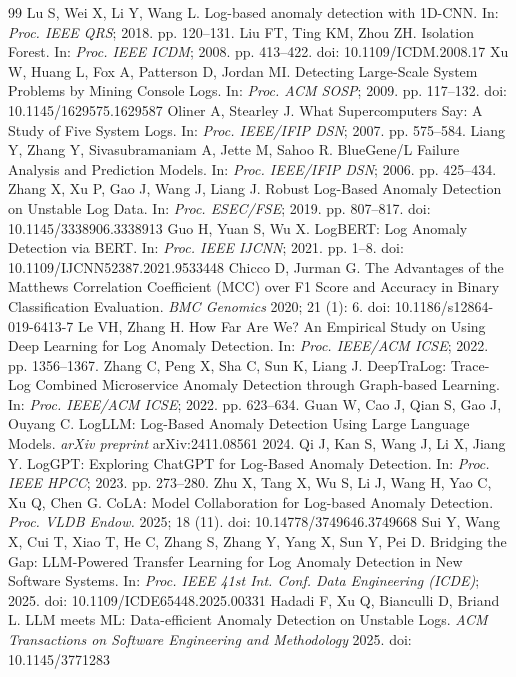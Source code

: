 \documentclass{elektr}
\begin{document}
\begin{thebibliography}{99}
 Lu S, Wei X, Li Y, Wang L. Log-based anomaly detection with 1D-CNN. In: \textit{Proc. IEEE QRS}; 2018. pp. 120--131.
 Liu FT, Ting KM, Zhou ZH. Isolation Forest. In: \textit{Proc. IEEE ICDM}; 2008. pp. 413--422. doi: 10.1109/ICDM.2008.17
 Xu W, Huang L, Fox A, Patterson D, Jordan MI. Detecting Large-Scale System Problems by Mining Console Logs. In: \textit{Proc. ACM SOSP}; 2009. pp. 117--132. doi: 10.1145/1629575.1629587
 Oliner A, Stearley J. What Supercomputers Say: A Study of Five System Logs. In: \textit{Proc. IEEE/IFIP DSN}; 2007. pp. 575--584.
 Liang Y, Zhang Y, Sivasubramaniam A, Jette M, Sahoo R. BlueGene/L Failure Analysis and Prediction Models. In: \textit{Proc. IEEE/IFIP DSN}; 2006. pp. 425--434.
 Zhang X, Xu P, Gao J, Wang J, Liang J. Robust Log-Based Anomaly Detection on Unstable Log Data. In: \textit{Proc. ESEC/FSE}; 2019. pp. 807--817. doi: 10.1145/3338906.3338913
 Guo H, Yuan S, Wu X. LogBERT: Log Anomaly Detection via BERT. In: \textit{Proc. IEEE IJCNN}; 2021. pp. 1--8. doi: 10.1109/IJCNN52387.2021.9533448
 Chicco D, Jurman G. The Advantages of the Matthews Correlation Coefficient (MCC) over F1 Score and Accuracy in Binary Classification Evaluation. \textit{BMC Genomics} 2020; 21 (1): 6. doi: 10.1186/s12864-019-6413-7
 Le VH, Zhang H. How Far Are We? An Empirical Study on Using Deep Learning for Log Anomaly Detection. In: \textit{Proc. IEEE/ACM ICSE}; 2022. pp. 1356--1367.
 Zhang C, Peng X, Sha C, Sun K, Liang J. DeepTraLog: Trace-Log Combined Microservice Anomaly Detection through Graph-based Learning. In: \textit{Proc. IEEE/ACM ICSE}; 2022. pp. 623--634.
 Guan W, Cao J, Qian S, Gao J, Ouyang C. LogLLM: Log-Based Anomaly Detection Using Large Language Models. \textit{arXiv preprint} arXiv:2411.08561 2024.
 Qi J, Kan S, Wang J, Li X, Jiang Y. LogGPT: Exploring ChatGPT for Log-Based Anomaly Detection. In: \textit{Proc. IEEE HPCC}; 2023. pp. 273--280.
 Zhu X, Tang X, Wu S, Li J, Wang H, Yao C, Xu Q, Chen G. CoLA: Model Collaboration for Log-based Anomaly Detection. \textit{Proc. VLDB Endow.} 2025; 18 (11). doi: 10.14778/3749646.3749668
 Sui Y, Wang X, Cui T, Xiao T, He C, Zhang S, Zhang Y, Yang X, Sun Y, Pei D. Bridging the Gap: LLM-Powered Transfer Learning for Log Anomaly Detection in New Software Systems. In: \textit{Proc. IEEE 41st Int. Conf. Data Engineering (ICDE)}; 2025. doi: 10.1109/ICDE65448.2025.00331
 Hadadi F, Xu Q, Bianculli D, Briand L. LLM meets ML: Data-efficient Anomaly Detection on Unstable Logs. \textit{ACM Transactions on Software Engineering and Methodology} 2025. doi: 10.1145/3771283
\end{thebibliography}
\end{document}
